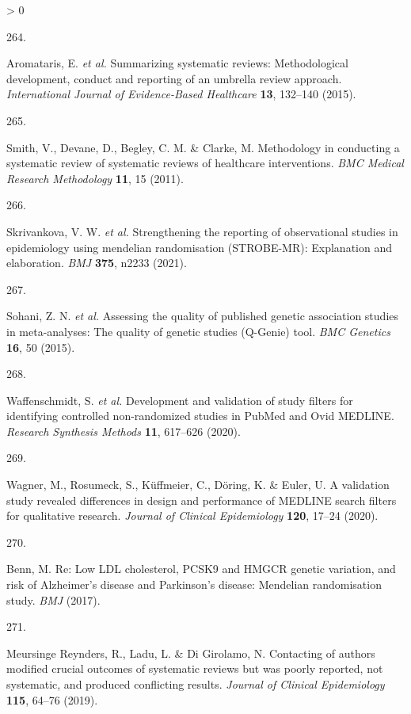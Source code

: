 \documentclass[a4paper, twoside]{templates/ociamthesis}
\newlength{\cslhangindent}
\newlength{\csllabelwidth}
\newenvironment{CSLReferences}[3] %
 {%
  \setlength{\parindent}{0pt}
  \ifodd #1 \everypar{\setlength{\hangindent}{\cslhangindent}}\ignorespaces\fi
  \ifnum #2 > 0
  \setlength{\parskip}{#2\baselineskip}
  \fi
 }%
 {}
\newcommand{\CSLLeftMargin}[1]{\parbox[t]{\maxof{\widthof{#1}}{\csllabelwidth}}{#1}}
\newcommand{\CSLRightInline}[1]{\parbox[t]{\linewidth - \csllabelwidth}{#1}}
\begin{document}
\begin{CSLReferences}{0}{0}
\leavevmode\hypertarget{ref-aromataris2015}{}%
\CSLLeftMargin{264. }
\CSLRightInline{Aromataris, E. \emph{et al.} Summarizing systematic reviews: Methodological development, conduct and reporting of an umbrella review approach. \emph{International Journal of Evidence-Based Healthcare} \textbf{13}, 132--140 (2015).}

\leavevmode\hypertarget{ref-smith2011}{}%
\CSLLeftMargin{265. }
\CSLRightInline{Smith, V., Devane, D., Begley, C. M. \& Clarke, M. Methodology in conducting a systematic review of systematic reviews of healthcare interventions. \emph{BMC Medical Research Methodology} \textbf{11}, 15 (2011).}

\leavevmode\hypertarget{ref-skrivankova2021}{}%
\CSLLeftMargin{266. }
\CSLRightInline{Skrivankova, V. W. \emph{et al.} Strengthening the reporting of observational studies in epidemiology using mendelian randomisation ({STROBE}-{MR}): Explanation and elaboration. \emph{BMJ} \textbf{375}, n2233 (2021).}

\leavevmode\hypertarget{ref-sohani2015}{}%
\CSLLeftMargin{267. }
\CSLRightInline{Sohani, Z. N. \emph{et al.} Assessing the quality of published genetic association studies in meta-analyses: The quality of genetic studies ({Q}-{Genie}) tool. \emph{BMC Genetics} \textbf{16}, 50 (2015).}

\leavevmode\hypertarget{ref-waffenschmidt2020}{}%
\CSLLeftMargin{268. }
\CSLRightInline{Waffenschmidt, S. \emph{et al.} Development and validation of study filters for identifying controlled non-randomized studies in {PubMed} and {Ovid MEDLINE}. \emph{Research Synthesis Methods} \textbf{11}, 617--626 (2020).}

\leavevmode\hypertarget{ref-wagner2020}{}%
\CSLLeftMargin{269. }
\CSLRightInline{Wagner, M., Rosumeck, S., Küffmeier, C., Döring, K. \& Euler, U. A validation study revealed differences in design and performance of {MEDLINE} search filters for qualitative research. \emph{Journal of Clinical Epidemiology} \textbf{120}, 17--24 (2020).}

\leavevmode\hypertarget{ref-benn2017comment}{}%
\CSLLeftMargin{270. }
\CSLRightInline{Benn, M. Re: Low {LDL} cholesterol, {PCSK9} and {HMGCR} genetic variation, and risk of {Alzheimer}'s disease and {Parkinson}'s disease: Mendelian randomisation study. \emph{BMJ} (2017).}

\leavevmode\hypertarget{ref-meursingereynders2019}{}%
\CSLLeftMargin{271. }
\CSLRightInline{Meursinge Reynders, R., Ladu, L. \& Di Girolamo, N. Contacting of authors modified crucial outcomes of systematic reviews but was poorly reported, not systematic, and produced conflicting results. \emph{Journal of Clinical Epidemiology} \textbf{115}, 64--76 (2019).}


\end{CSLReferences}
\end{document}
